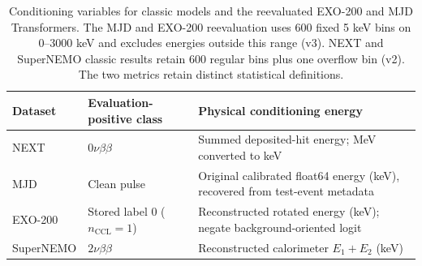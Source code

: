 \begin{table}[t]
\caption{Conditioning variables for classic models and the reevaluated EXO-200 and MJD Transformers. The MJD and EXO-200 reevaluation uses 600 fixed 5 keV bins on 0--3000 keV and excludes energies outside this range (v3). NEXT and SuperNEMO classic results retain 600 regular bins plus one overflow bin (v2). The two metrics retain distinct statistical definitions.}
\label{tab:metric-protocols}
\centering\small
\setlength{\tabcolsep}{4pt}
\begin{tabular}{p{.14\linewidth}p{.31\linewidth}p{.45\linewidth}}
\toprule
Dataset & Evaluation-positive class & Physical conditioning energy \\
\midrule
NEXT & $0\nu\beta\beta$ & Summed deposited-hit energy; MeV converted to keV \\
MJD & Clean pulse & Original calibrated float64 energy (keV), recovered from test-event metadata \\
EXO-200 & Stored label 0 ($n_{\mathrm{CCL}}=1$) & Reconstructed rotated energy (keV); negate background-oriented logit \\
SuperNEMO & $2\nu\beta\beta$ & Reconstructed calorimeter $E_1+E_2$ (keV) \\
\bottomrule
\end{tabular}
\end{table}
